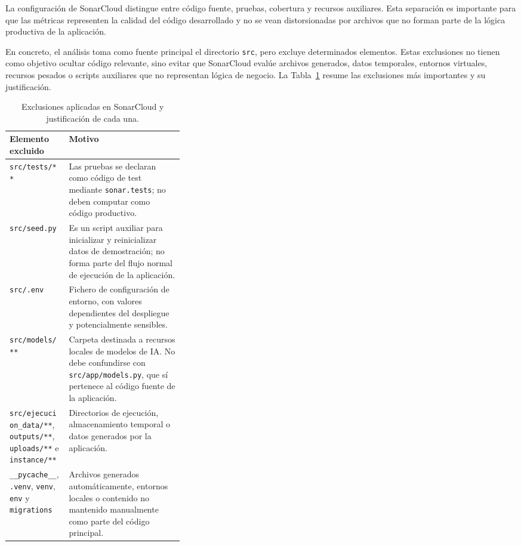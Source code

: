 La configuración de SonarCloud distingue entre código fuente, pruebas, cobertura y recursos auxiliares. Esta separación es importante para que las métricas representen la calidad del código desarrollado y no se vean distorsionadas por archivos que no forman parte de la lógica productiva de la aplicación.

En concreto, el análisis toma como fuente principal el directorio \texttt{src}, pero excluye determinados elementos. Estas exclusiones no tienen como objetivo ocultar código relevante, sino evitar que SonarCloud evalúe archivos generados, datos temporales, entornos virtuales, recursos pesados o scripts auxiliares que no representan lógica de negocio. La Tabla~\ref{tabla:exclusiones_sonarcloud} resume las exclusiones más importantes y su justificación.

\begin{table}[H]
	\centering
	\small
	\renewcommand{\arraystretch}{1.12}
	\begin{tabularx}{\linewidth}{p{0.34\linewidth}X}
		\toprule
		\textbf{Elemento excluido} & \textbf{Motivo} \\
		\midrule
		\texttt{src/tests/**} & Las pruebas se declaran como código de test mediante \texttt{sonar.tests}; no deben computar como código productivo. \\
		\texttt{src/seed.py} & Es un script auxiliar para inicializar y reinicializar datos de demostración; no forma parte del flujo normal de ejecución de la aplicación. \\
		\texttt{src/.env} & Fichero de configuración de entorno, con valores dependientes del despliegue y potencialmente sensibles. \\
		\texttt{src/models/**} & Carpeta destinada a recursos locales de modelos de IA. No debe confundirse con \texttt{src/app/models.py}, que sí pertenece al código fuente de la aplicación. \\
		\texttt{src/ejecucion\_data/**}, \texttt{outputs/**}, \texttt{uploads/**} e \texttt{instance/**} & Directorios de ejecución, almacenamiento temporal o datos generados por la aplicación. \\
		\texttt{\_\_pycache\_\_}, \texttt{.venv}, \texttt{venv}, \texttt{env} y \texttt{migrations} & Archivos generados automáticamente, entornos locales o contenido no mantenido manualmente como parte del código principal. \\
		\bottomrule
	\end{tabularx}
	\caption[Exclusiones del análisis estático]{Exclusiones aplicadas en SonarCloud y justificación de cada una.}
	\label{tabla:exclusiones_sonarcloud}
\end{table}

